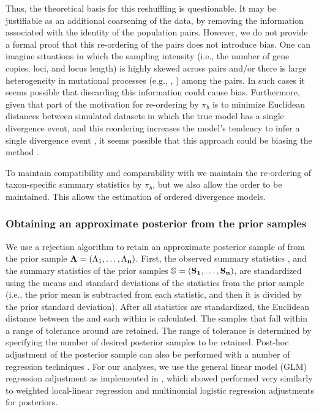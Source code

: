 \documentclass[letterpaper,12pt]{article}
\begin{document}
\begin{linenumbers}
Thus, the theoretical basis for this reshuffling is questionable.
It may be justifiable as an additional coarsening of the data,
by removing the information associated with the identity of the
population pairs.
However, we do not provide a formal proof that this re-ordering of the pairs
does not introduce bias.
One can imagine situations in which the sampling intensity (i.e., the
number of gene copies, loci, and locus length) is highly skewed across
pairs and/or there is large heterogeneity in mutational processes
(e.g., \hkyModel{}{}, \mutationRateScalarConstant{}{}) among the pairs.
In such cases it seems possible that discarding this information could
cause bias.
Furthermore, given that part of the motivation for re-ordering by $\pi_b$ is to
minimize Euclidean distances between simulated datasets in which the true model
has a single divergence event, and this reordering increases the model's
tendency to infer a single divergence event \citep{Huang2011}, it seems
possible that this approach could be biasing the method \citet{Oaks2012}.

To maintain compatibility and comparability with \msb we maintain
the re-ordering of taxon-specific summary statistics by $\pi_b$, but
we also allow the order to be maintained.
This allows the estimation of ordered divergence models.

\subsubsection*{Obtaining an approximate posterior from the prior samples}
We use a rejection algorithm to retain an approximate posterior sample of
\paramSampleVector{} from the prior sample
$\boldsymbol{\Lambda_{}} = (\Lambda_{1}, \ldots, \Lambda_{\mathbf{n}})$.
First, the observed summary statistics \ssVectorObs, and the summary statistics
of the prior samples 
$\ssMatrix = (\ssVector{1}, \ldots, \ssVector{\numPriorSamples})$,
are standardized using the means and standard deviations of the statistics from
the prior sample (i.e., the prior mean is subtracted from each statistic, and then
it is divided by the prior standard deviation).
After all statistics are standardized, the Euclidean distance between
the \ssVectorObs and each \ssVector{} within \ssMatrix is calculated.
The samples that fall within a range of tolerance \tol around \ssVectorObs
are retained.
The range of tolerance is determined by specifying the number of desired
posterior samples to be retained.
Post-hoc adjustment of the posterior sample can also be performed with a number
of regression techniques \citep{Beaumont2002,Blum2009,Leuenberger2010}.
For our analyses, we use the general linear model (GLM) regression adjustment
\citet{Leuenberger2010} as implemented in \abctoolbox
\citep[v1.1;][]{ABCtoolbox}, which \citet{Oaks2012} showed performed very
similarly to weighted local-linear regression and multinomial logistic
regression adjustments \citep{Beaumont2002} for \msb posteriors.



\end{linenumbers}
\end{document}
